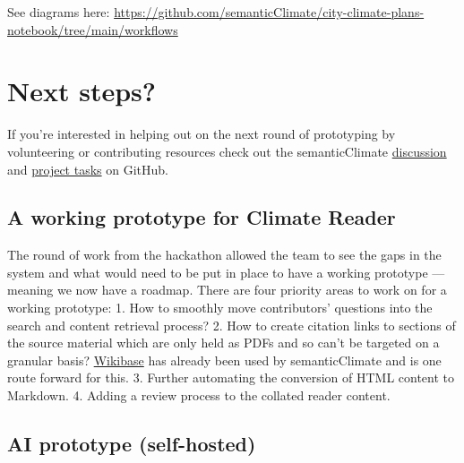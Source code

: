 \documentclass[
  letterpaper,
  DIV=11,
  numbers=noendperiod]{scrreprt}
\begin{document}
See diagrams here:
\url{https://github.com/semanticClimate/city-climate-plans-notebook/tree/main/workflows}

\hypertarget{next-steps}{%
\section{Next steps?}\label{next-steps}}

If you're interested in helping out on the next round of prototyping by
volunteering or contributing resources check out the semanticClimate
\href{https://github.com/petermr/semanticClimate/discussions/32}{discussion}
and \href{https://github.com/orgs/semanticClimate/projects/3}{project
tasks} on GitHub.

\hypertarget{a-working-prototype-for-climate-reader}{%
\subsection{A working prototype for Climate
Reader}\label{a-working-prototype-for-climate-reader}}

The round of work from the hackathon allowed the team to see the gaps in
the system and what would need to be put in place to have a working
prototype --- meaning we now have a roadmap. There are four priority
areas to work on for a working prototype: 1. How to smoothly move
contributors' questions into the search and content retrieval process?
2. How to create citation links to sections of the source material which
are only held as PDFs and so can't be targeted on a granular basis?
\href{https://semanticclimate.org/IPCC-Queries/}{Wikibase} has already
been used by semanticClimate and is one route forward for this. 3.
Further automating the conversion of HTML content to Markdown. 4. Adding
a review process to the collated reader content.

\hypertarget{ai-prototype-self-hosted}{%
\subsection{AI prototype (self-hosted)}\label{ai-prototype-self-hosted}}
\end{document}
